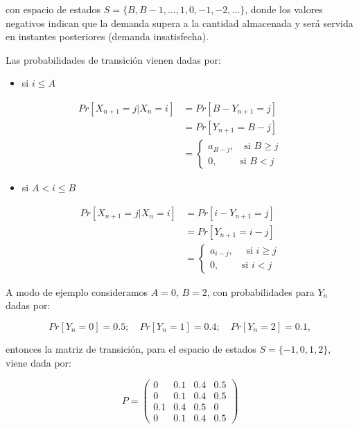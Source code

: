 \documentclass[
]{book}
\providecommand{\tightlist}{%
  \setlength{\itemsep}{0pt}\setlength{\parskip}{0pt}}
\theoremstyle{definition}
\theoremstyle{definition}
\theoremstyle{definition}
\theoremstyle{definition}
\theoremstyle{remark}
\begin{document}
con espacio de estados \(S = \{B, B-1,..., 1, 0, -1, -2,...\}\), donde los valores negativos indican que la demanda supera a la cantidad almacenada y será servida en instantes posteriores (demanda insatisfecha).

Las probabilidades de transición vienen dadas por:

\begin{itemize}
\tightlist
\item
  si \(i \leq A\)
\end{itemize}

\[\begin{array}{ll}
Pr[X_{n+1} = j | X_{n} =i]&= Pr[B - Y_{n+1} = j] \\
&=Pr[Y_{n+1} = B-j]   \\
& = \begin{cases} 
a_{B-j}, \quad \text{si } B \geq j\\
0,  \qquad \text{ si } B < j
\end{cases}
\end{array}\]

\begin{itemize}
\tightlist
\item
  si \(A < i \leq B\)
\end{itemize}

\[\begin{array}{ll}
Pr[X_{n+1} = j | X_{n}=i] & = Pr[i - Y_{n+1} = j] \\
&=Pr[Y_{n+1} = i-j]   \\
& =  \begin{cases}
a_{i-j}, \quad \text{ si } i \geq j\\
 0, \qquad \text{ si } i < j
 \end{cases}
\end{array}\]

A modo de ejemplo consideramos \(A = 0\), \(B = 2\), con probabilidades para \(Y_n\) dadas por:

\[Pr[Y_n = 0] = 0.5; \quad Pr[Y_n = 1] = 0.4; \quad Pr[Y_n = 2] = 0.1,\]

entonces la matriz de transición, para el espacio de estados \(S = \{-1, 0, 1, 2\}\), viene dada por:

\[P = 
\begin{pmatrix}
0 & 0.1 & 0.4 & 0.5\\
0 & 0.1 & 0.4 & 0.5\\
0.1 & 0.4 & 0.5 & 0\\
0 & 0.1 & 0.4 & 0.5
\end{pmatrix}\]
\end{document}
